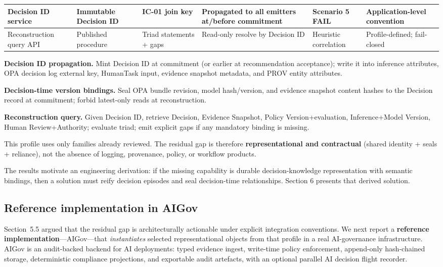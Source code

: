 \documentclass[11pt,a4paper]{article}
\begin{document}
\begin{table}[t]
\begin{tabularx}{\textwidth}{|X|X|X|X|X|X|}
 \hline
 Decision ID service & Immutable Decision ID & IC-01 join key & Propagated to all emitters at/before commitment & Scenario 5 FAIL & Application-level convention \\
 \hline
 Reconstruction query API & Published procedure & Triad statements + gaps & Read-only resolve by Decision ID & Heuristic correlation & Profile-defined; fail-closed \\
 \hline
\end{tabularx}
\end{table}

\textbf{Decision ID propagation.} Mint Decision ID at commitment (or earlier at recommendation acceptance); write it into inference attributes, OPA decision log external key, HumanTask input, evidence snapshot metadata, and PROV entity attributes.


\textbf{Decision-time version bindings.} Seal OPA bundle revision, model hash/version, and evidence snapshot content hashes to the Decision record at commitment; forbid latest-only reads at reconstruction.


\textbf{Reconstruction query.} Given Decision ID, retrieve Decision, Evidence Snapshot, Policy Version+evaluation, Inference+Model Version, Human Review+Authority; evaluate triad; emit explicit gaps if any mandatory binding is missing.


This profile uses only families already reviewed. The residual gap is therefore \textbf{representational and contractual} (shared identity + seals + reliance), not the absence of logging, provenance, policy, or workflow products.



The results motivate an engineering derivation: if the missing capability is durable decision-knowledge representation with semantic bindings, then a solution must reify decision episodes and seal decision-time relationships. Section 6 presents that derived solution.




\subsection{Reference implementation in AIGov}

Section~5.5 argued that the residual gap is architecturally actionable under explicit integration conventions. We next report a \textbf{reference implementation}---AIGov---that \emph{instantiates} selected representational objects from that profile in a real AI-governance infrastructure. AIGov is an audit-backed backend for AI deployments: typed evidence ingest, write-time policy enforcement, append-only hash-chained storage, deterministic compliance projections, and exportable audit artefacts, with an optional parallel AI decision flight recorder.
\end{document}
